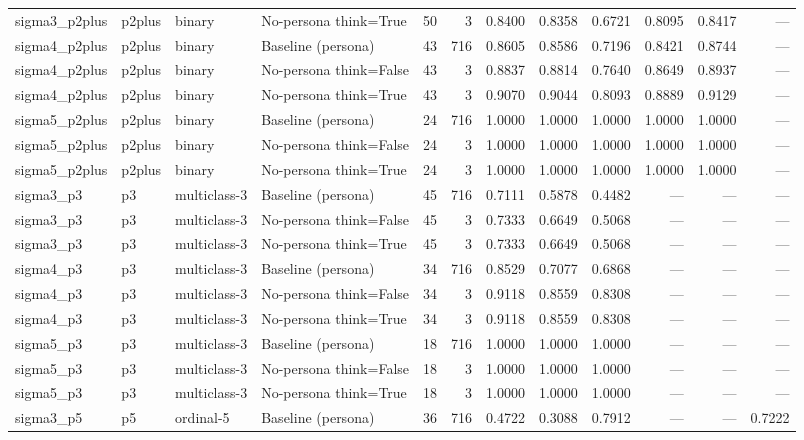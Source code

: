 \begin{table}
{\begin{tabular}{llllrrrrrrrr}
sigma3\_p2plus & p2plus & binary & No-persona think=True & 50 & 3 & 0.8400 & 0.8358 & 0.6721 & 0.8095 & 0.8417 & --- \\
sigma4\_p2plus & p2plus & binary & Baseline (persona) & 43 & 716 & 0.8605 & 0.8586 & 0.7196 & 0.8421 & 0.8744 & --- \\
sigma4\_p2plus & p2plus & binary & No-persona think=False & 43 & 3 & 0.8837 & 0.8814 & 0.7640 & 0.8649 & 0.8937 & --- \\
sigma4\_p2plus & p2plus & binary & No-persona think=True & 43 & 3 & 0.9070 & 0.9044 & 0.8093 & 0.8889 & 0.9129 & --- \\
sigma5\_p2plus & p2plus & binary & Baseline (persona) & 24 & 716 & 1.0000 & 1.0000 & 1.0000 & 1.0000 & 1.0000 & --- \\
sigma5\_p2plus & p2plus & binary & No-persona think=False & 24 & 3 & 1.0000 & 1.0000 & 1.0000 & 1.0000 & 1.0000 & --- \\
sigma5\_p2plus & p2plus & binary & No-persona think=True & 24 & 3 & 1.0000 & 1.0000 & 1.0000 & 1.0000 & 1.0000 & --- \\
sigma3\_p3 & p3 & multiclass-3 & Baseline (persona) & 45 & 716 & 0.7111 & 0.5878 & 0.4482 & --- & --- & --- \\
sigma3\_p3 & p3 & multiclass-3 & No-persona think=False & 45 & 3 & 0.7333 & 0.6649 & 0.5068 & --- & --- & --- \\
sigma3\_p3 & p3 & multiclass-3 & No-persona think=True & 45 & 3 & 0.7333 & 0.6649 & 0.5068 & --- & --- & --- \\
sigma4\_p3 & p3 & multiclass-3 & Baseline (persona) & 34 & 716 & 0.8529 & 0.7077 & 0.6868 & --- & --- & --- \\
sigma4\_p3 & p3 & multiclass-3 & No-persona think=False & 34 & 3 & 0.9118 & 0.8559 & 0.8308 & --- & --- & --- \\
sigma4\_p3 & p3 & multiclass-3 & No-persona think=True & 34 & 3 & 0.9118 & 0.8559 & 0.8308 & --- & --- & --- \\
sigma5\_p3 & p3 & multiclass-3 & Baseline (persona) & 18 & 716 & 1.0000 & 1.0000 & 1.0000 & --- & --- & --- \\
sigma5\_p3 & p3 & multiclass-3 & No-persona think=False & 18 & 3 & 1.0000 & 1.0000 & 1.0000 & --- & --- & --- \\
sigma5\_p3 & p3 & multiclass-3 & No-persona think=True & 18 & 3 & 1.0000 & 1.0000 & 1.0000 & --- & --- & --- \\
sigma3\_p5 & p5 & ordinal-5 & Baseline (persona) & 36 & 716 & 0.4722 & 0.3088 & 0.7912 & --- & --- & 0.7222 \\

\end{tabular}}
\end{table}
